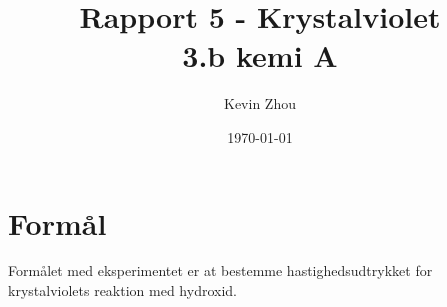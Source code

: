 \documentclass{report}
\title{Rapport 5 - Krystalviolet\\
{\Large \textbf{3.b kemi A}}}
\author{Kevin Zhou}
\date{\today}
\begin{document}
\maketitle
\section*{Formål}
Formålet med eksperimentet er at bestemme hastighedsudtrykket for krystalviolets reaktion med hydroxid.
\end{document}
